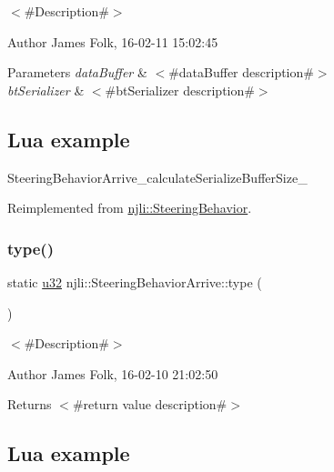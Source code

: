 $<$\#\+Description\#$>$ 

\begin{DoxyAuthor}{Author}
James Folk, 16-\/02-\/11 15\+:02\+:45
\end{DoxyAuthor}

\begin{DoxyParams}{Parameters}
{\em data\+Buffer} & $<$\#data\+Buffer description\#$>$ \\
\hline
{\em bt\+Serializer} & $<$\#bt\+Serializer description\#$>$\\
\hline
\end{DoxyParams}
\hypertarget{classnjli_1_1_steering_behavior_wander_ex1}{}\subsection{Lua example}\label{classnjli_1_1_steering_behavior_wander_ex1}

\begin{DoxyCodeInclude}
\end{DoxyCodeInclude}
Steering\+Behavior\+Arrive\+\_\+calculate\+Serialize\+Buffer\+Size\+\_\+ 

Reimplemented from \mbox{\hyperlink{classnjli_1_1_steering_behavior_aa8494cb4a327c0040f64cfe8b393786e}{njli\+::\+Steering\+Behavior}}.

\mbox{\label{classnjli_1_1_steering_behavior_arrive_a773e7919cb6643e9eb5b362fc3fac97f}} 
\subsubsection{\texorpdfstring{type()}{type()}}
{\footnotesize\ttfamily static \mbox{\hyperlink{_util_8h_a10e94b422ef0c20dcdec20d31a1f5049}{u32}} njli\+::\+Steering\+Behavior\+Arrive\+::type (\begin{DoxyParamCaption}{ }\end{DoxyParamCaption})\hspace{0.3cm}{\ttfamily [static]}}



$<$\#\+Description\#$>$ 

\begin{DoxyAuthor}{Author}
James Folk, 16-\/02-\/10 21\+:02\+:50
\end{DoxyAuthor}
\begin{DoxyReturn}{Returns}
$<$\#return value description\#$>$
\end{DoxyReturn}
\hypertarget{classnjli_1_1_steering_behavior_wander_ex1}{}\subsection{Lua example}\label{classnjli_1_1_steering_behavior_wander_ex1}

